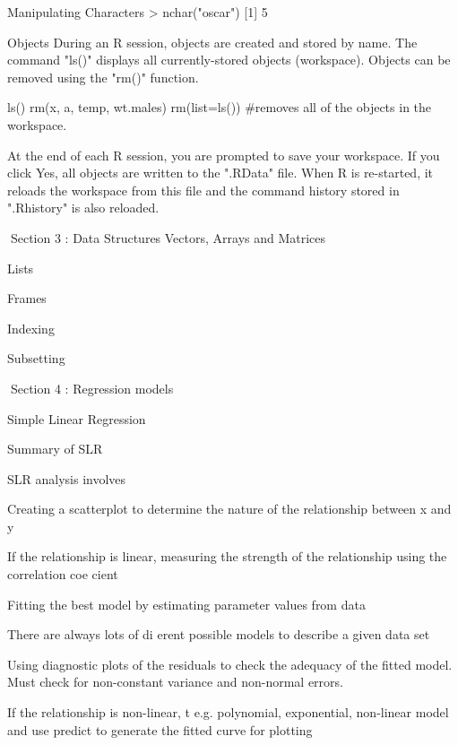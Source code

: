 \begin{frame}
Manipulating Characters
> nchar("oscar")
[1] 5

Objects
During an R session, objects are created and stored by name. The command "ls()" displays all currently-stored objects (workspace). Objects can be removed using the "rm()" function.

\end{frame}
\begin{frame}

ls()
rm(x, a, temp, wt.males)
rm(list=ls())								#removes all of the objects in the workspace.


At the end of each R session, you are prompted to save your workspace. If you click Yes, all objects are written to the ".RData" file. 
When R is re-started, it reloads the workspace from this file and the command history stored in ".Rhistory" is also reloaded.



Section 3 : Data Structures
Vectors, Arrays and Matrices

Lists

Frames

Indexing

Subsetting

Section 4 : Regression models

Simple Linear Regression


Summary of SLR


SLR analysis involves

Creating a scatterplot to determine the nature of the relationship between x and y

If the relationship is linear, measuring the strength of the relationship using the correlation coe cient

Fitting the best model by estimating parameter values from data

There are always lots of di erent possible models to describe a given data set

Using diagnostic plots of the residuals to check the adequacy of the fitted model. Must check for non-constant variance and non-normal errors.

If the relationship is non-linear, t e.g. polynomial, exponential, non-linear model and use predict to generate the fitted curve for plotting




\end{frame}
